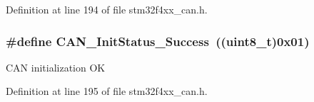 Definition at line 194 of file stm32f4xx\-\_\-can.\-h.

\hypertarget{group___c_a_n___init_status_ga6bed5957af8f2f6b00568e15ccac5772}{
\subsubsection[{C\-A\-N\-\_\-\-Init\-Status\-\_\-\-Success}]{\setlength{\rightskip}{0pt plus 5cm}\#define C\-A\-N\-\_\-\-Init\-Status\-\_\-\-Success~((uint8\-\_\-t)0x01)}}\label{group___c_a_n___init_status_ga6bed5957af8f2f6b00568e15ccac5772}
C\-A\-N initialization O\-K 

Definition at line 195 of file stm32f4xx\-\_\-can.\-h.

